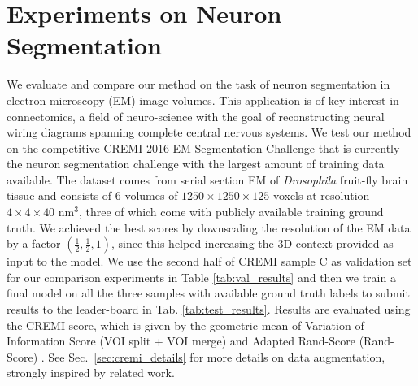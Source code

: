 

\section{Experiments on Neuron Segmentation}
We evaluate and compare our method on the task of neuron segmentation in electron microscopy (EM) image volumes. This application is of key interest in connectomics, a field of neuro-science with the goal of reconstructing neural wiring diagrams spanning complete central nervous systems. 
We test our method on the competitive CREMI 2016 EM Segmentation Challenge \cite{cremi} that is currently the neuron segmentation challenge with the largest amount of training data available. The dataset comes from serial section EM of \emph{Drosophila} fruit-fly brain tissue and consists of 6 volumes of $1250\times 1250\times 125$ voxels at resolution $4\times 4\times 40$ nm$^3$, three of which come with publicly available training ground truth. 
We achieved the best scores by downscaling the resolution of the EM data by a factor $(\frac{1}{2},\frac{1}{2},1)$, since this helped increasing the 3D context provided as input to the model.
We use the second half of CREMI sample C as validation set for our comparison experiments in Table \ref{tab:val_results} and then we train a final model on all the three samples with available ground truth labels to submit results to the leader-board in Tab. \ref{tab:test_results}. 
Results  are evaluated using the CREMI score, which is given by the geometric mean of Variation of Information Score (VOI split + VOI merge) and Adapted Rand-Score (Rand-Score) \cite{arganda2015crowdsourcing}. See Sec.~\ref{sec:cremi_details} for more details on data augmentation, strongly inspired by related work.




